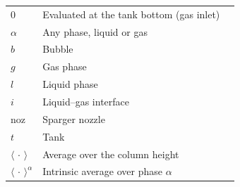 \begin{xltabular}{\linewidth}{@{}l X l@{}}
\addlinespace[1em]
 \\
\midrule
$0$            & Evaluated at the tank bottom (gas inlet)   & \\
$\alpha$       & Any phase, liquid or gas                   & \\
$b$            & Bubble                                     & \\
$g$            & Gas phase                                  & \\
$l$            & Liquid phase                               & \\
$i$            & Liquid--gas interface                      & \\
noz            & Sparger nozzle                             & \\
$t$            & Tank                                       & \\
$\langle\,\cdot\,\rangle$ & Average over the column height  & \\
$\langle\,\cdot\,\rangle^\alpha$ & Intrinsic average over phase $\alpha$ & \\


\end{xltabular}
